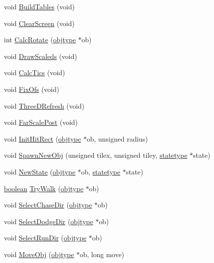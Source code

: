 \begin{DoxyCompactItemize}
void \hyperlink{WL__DEF_8H_aebfb7b9493a691dd53697b23e3189822}{BuildTables} (void)
\item 
void \hyperlink{WL__DEF_8H_a5473c6cfd6c580642133754e141ca556}{ClearScreen} (void)
\item 
int \hyperlink{WL__DEF_8H_a3a99a69629692f4c3650d6897b8a50be}{CalcRotate} (\hyperlink{structobjstruct}{objtype} $\ast$ob)
\item 
void \hyperlink{WL__DEF_8H_a3f31beef974ac9e631c4b634d91ba701}{DrawScaleds} (void)
\item 
void \hyperlink{WL__DEF_8H_af0ec8fc59f12a59ce2ed1c270150bdb0}{CalcTics} (void)
\item 
void \hyperlink{WL__DEF_8H_a31ead32276ab38dbf2991c82ee38ea7c}{FixOfs} (void)
\item 
void \hyperlink{WL__DEF_8H_abde2aab3bb185f39bd50f4574444a034}{ThreeDRefresh} (void)
\item 
void \hyperlink{WL__DEF_8H_aeee237495a97abc0d12cd405446ac92b}{FarScalePost} (void)
\item 
void \hyperlink{WL__DEF_8H_ab87da33340a8719c4a05dd4df403c3f0}{InitHitRect} (\hyperlink{structobjstruct}{objtype} $\ast$ob, unsigned radius)
\item 
void \hyperlink{WL__DEF_8H_a2672e808d8c088645b48e17c1f3608ce}{SpawnNewObj} (unsigned tilex, unsigned tiley, \hyperlink{structstatestruct}{statetype} $\ast$state)
\item 
void \hyperlink{WL__DEF_8H_aefe4aac0ca3aa18b1943d8e096162a13}{NewState} (\hyperlink{structobjstruct}{objtype} $\ast$ob, \hyperlink{structstatestruct}{statetype} $\ast$state)
\item 
\hyperlink{ID__HEAD_8H_a7c6368b321bd9acd0149b030bb8275ed}{boolean} \hyperlink{WL__DEF_8H_afc2aee564bbde3329ca837f177130917}{TryWalk} (\hyperlink{structobjstruct}{objtype} $\ast$ob)
\item 
void \hyperlink{WL__DEF_8H_aaa5f3bd33e28df6ee38db0b950fb1b45}{SelectChaseDir} (\hyperlink{structobjstruct}{objtype} $\ast$ob)
\item 
void \hyperlink{WL__DEF_8H_abf00c4afcd01d66f8b6ba4d9b308ce6f}{SelectDodgeDir} (\hyperlink{structobjstruct}{objtype} $\ast$ob)
\item 
void \hyperlink{WL__DEF_8H_a160d81dd6ea23ee5cee5cd31d6b9c627}{SelectRunDir} (\hyperlink{structobjstruct}{objtype} $\ast$ob)
\item 
void \hyperlink{WL__DEF_8H_acc590a0c3cb09dd88e7727cbed040ec4}{MoveObj} (\hyperlink{structobjstruct}{objtype} $\ast$ob, long move)
\item 

\end{DoxyCompactItemize}

